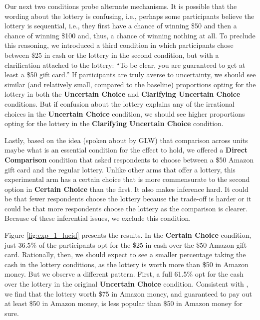 \documentclass[12pt, letterpaper]{article}
\begin{document}
Our next two conditions probe alternate mechanisms. It is possible that the wording about the lottery is confusing, i.e., perhaps some participants believe the lottery is sequential, i.e., they first have a chance of winning \$50 and then a chance of winning \$100 and, thus, a chance of winning nothing at all. To preclude this reasoning, we introduced a third condition in which participants chose between \$25 in cash or the lottery in the second condition, but with a clarification attached to the lottery: ``To be clear, you are guaranteed to get at least a \$50 gift card.'' If participants are truly averse to uncertainty, we should see similar (and relatively small, compared to the baseline) proportions opting for the lottery in both the \textbf{Uncertain Choice} and \textbf{Clarifying Uncertain Choice} conditions. But if confusion about the lottery explains any of the irrational choices in the \textbf{Uncertain Choice} condition, we should see higher proportions opting for the lottery in the \textbf{Clarifying Uncertain Choice} condition.

Lastly, based on the idea (spoken about by GLW) that comparison across units maybe what is an essential condition for the effect to hold, we offered a \textbf{Direct Comparison} condition that asked respondents to choose between a \$50 Amazon gift card and the regular lottery. Unlike other arms that offer a lottery, this experimental arm has a certain choice that is more commensurate to the second option in \textbf{Certain Choice} than the first. It also makes inference hard. It could be that fewer respondents choose the lottery because the trade-off is harder or it could be that more respondents choose the lottery as the comparison is clearer. Because of these inferential issues, we exclude this condition.

Figure \ref{fig:exp_1_lucid} presents the results. In the \textbf{Certain Choice} condition, just 36.5\% of the participants opt for the \$25 in cash over the \$50 Amazon gift card. Rationally, then, we should expect to see a smaller percentage taking the cash in the lottery conditions, as the lottery is worth more than \$50 in Amazon money. But we observe a different pattern. First, a full 61.5\% opt for the cash over the lottery in the original \textbf{Uncertain Choice} condition. Consistent with \citet{gneezy2006uncertainty}, we find that the lottery worth \$75 in Amazon money, and guaranteed to pay out at least \$50 in Amazon money, is less popular than \$50 in Amazon money for sure.
\end{document}
